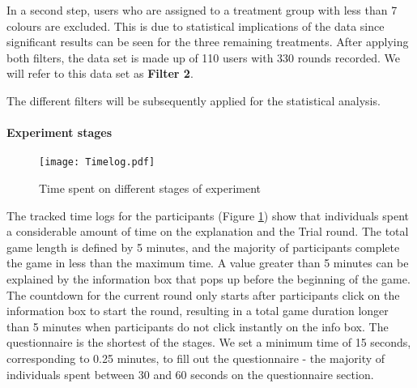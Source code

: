 In a second step, users who are assigned to a treatment group with less than 7 colours are excluded. This is due to statistical implications of the data since significant results can be seen for the three remaining treatments. After applying both filters, the data set is made up of 110 users with 330 rounds recorded. We will refer to this data set as \textbf{Filter 2}.

The different filters will be subsequently applied for the statistical analysis.
%
%
%
%
%
%

\paragraph{Experiment stages}
 \begin{figure}[htbp] %
\begin{center} %
  \texttt{[image: Timelog.pdf]}
  \caption[Time spent on different stages of experiment]{Time spent on different stages of experiment\footnotemark}
  \label{Time spent on different stages of experiment}
\end{center}
\end{figure}

The tracked time logs for the participants  (Figure \ref{Time spent on different stages of experiment}) show that individuals spent a considerable amount of time on the explanation and the Trial round. The total game length is defined by 5 minutes, and the majority of participants complete the game in less than the maximum time. A value greater than 5 minutes can be explained by the information box that pops up before the beginning of the game. The countdown for the current round only starts after participants click on the information box to start the round, resulting in a total game duration longer than 5 minutes when participants do not click instantly on the info box.
The questionnaire is the shortest of the stages. We set a minimum time of 15 seconds, corresponding to 0.25 minutes, to fill out the questionnaire - the majority of individuals spent between 30 and 60 seconds on the questionnaire section.

